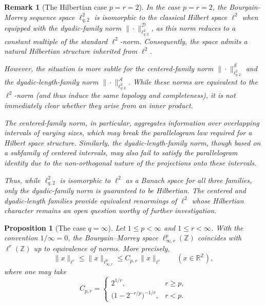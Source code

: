 \documentclass[preprint,12pt]{elsarticle}
\newtheorem{proposition}[theorem]{Proposition}
\newtheorem{remark}[theorem]{Remark}
\begin{document}
\begin{remark}[The Hilbertian case $p = r = 2$]
\label{rem:hilbertian_case}
In the case $p = r = 2$, the Bourgain-Morrey sequence space $\ell^{2}_{q,2}$ is isomorphic to the classical Hilbert space $\ell^2$ when equipped with the dyadic-family norm $\|\cdot\|^{\mathcal{D}}_{\ell_{q,2}^{2}}$, as this norm reduces to a constant multiple of the standard $\ell^2$-norm. Consequently, the space admits a natural Hilbertian structure inherited from $\ell^2$.

However, the situation is more subtle for the centered-family norm $\|\cdot\|^{\mathcal{S}}_{\ell_{q,2}^{2}}$ and the dyadic-length-family norm $\|\cdot\|^{\mathcal{A}}_{\ell_{q,2}^{2}}$. While these norms are equivalent to the $\ell^2$-norm (and thus induce the same topology and completeness), it is not immediately clear whether they arise from an inner product. 

The centered-family norm, in particular, aggregates information over overlapping intervals of varying sizes, which may break the parallelogram law required for a Hilbert space structure. Similarly, the dyadic-length-family norm, though based on a subfamily of centered intervals, may also fail to satisfy the parallelogram identity due to the non-orthogonal nature of the projections onto these intervals.

Thus, while $\ell^{2}_{q,2}$ is isomorphic to $\ell^2$ as a Banach space for all three families, only the dyadic-family norm is guaranteed to be Hilbertian. The centered and dyadic-length families provide equivalent renormings of $\ell^2$ whose Hilbertian character remains an open question worthy of further investigation.
\end{remark}
\begin{proposition}[The case $q=\infty$]\label{prop:q_infty}
Let $1\le p<\infty$ and $1\le r<\infty$. With the convention $1/\infty=0$, the Bourgain--Morrey space
$\ell^{p}_{\infty,r}(\mathbb{Z})$ coincides with $\ell^{r}(\mathbb{Z})$ up to equivalence of norms. More precisely,
\[
\|x\|_{\ell^r}\le \|x\|_{\ell^{p}_{\infty,r}} \le C_{p,r}\,\|x\|_{\ell^r}
\qquad (x\in\mathbb{R}^{\mathbb{Z}}),
\]
where one may take
\[
C_{p,r}=
\begin{cases}
2^{1/r}, & r\ge p,\\[2pt]
\big(1-2^{-r/p}\big)^{-1/r}, & r<p.
\end{cases}
\]
\end{proposition}
\end{document}
